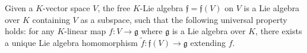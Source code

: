 Given a $K$-vector space $V$, the free $K$-Lie algebra $\mathfrak{f} = \mathfrak{f}(V)$ on $V$ is a Lie algebra over $K$ containing $V$ as a subspace, such that the following universal property holds: for any $K$-linear map $f : V \to \mathfrak{g}$ where $\mathfrak{g}$ is a Lie algebra over $K$, there exists a unique Lie algebra homomorphism $\tilde{f} : \mathfrak{f}(V) \to \mathfrak{g}$ extending $f$.
